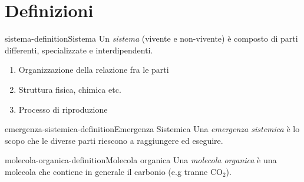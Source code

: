 \documentclass[preview]{standalone}
\begin{document}
\genpage

\section{Definizioni}

\begin{snippetdefinition}{sistema-definition}{Sistema}
    Un \textit{sistema} (vivente e non-vivente) è composto di parti differenti, specializzate e interdipendenti. 
    
    \begin{enumerate}
        \item Organizzazione della relazione fra le parti
        \item Struttura fisica, chimica etc. 
        \item Processo di riproduzione
    \end{enumerate}
\end{snippetdefinition}

\begin{snippetdefinition}{emergenza-sistemica-definition}{Emergenza Sistemica}
    Una \textit{emergenza sistemica} è lo scopo che le diverse parti riescono a raggiungere ed eseguire.
\end{snippetdefinition}


\begin{snippetdefinition}{molecola-organica-definition}{Molecola organica}
    Una \textit{molecola organica} è una molecola che contiene in generale il carbonio (e.g tranne CO\({}_2\)).
\end{snippetdefinition}
\end{document}
